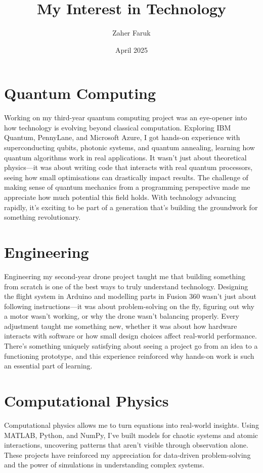 \documentclass{article}
\title{My Interest in Technology}
\author{Zaher Faruk}
\date{April 2025}
\begin{document}
\maketitle

\section{Quantum Computing}

Working on my third-year quantum computing project was an eye-opener into how technology is evolving beyond classical computation. Exploring IBM Quantum, PennyLane, and Microsoft Azure, I got hands-on experience with superconducting qubits, photonic systems, and quantum annealing, learning how quantum algorithms work in real applications. It wasn’t just about theoretical physics—it was about writing code that interacts with real quantum processors, seeing how small optimisations can drastically impact results. The challenge of making sense of quantum mechanics from a programming perspective made me appreciate how much potential this field holds. With technology advancing rapidly, it’s exciting to be part of a generation that’s building the groundwork for something revolutionary.

\section{Engineering}

Engineering my second-year drone project taught me that building something from scratch is one of the best ways to truly understand technology. Designing the flight system in Arduino and modelling parts in Fusion 360 wasn’t just about following instructions—it was about problem-solving on the fly, figuring out why a motor wasn’t working, or why the drone wasn’t balancing properly. Every adjustment taught me something new, whether it was about how hardware interacts with software or how small design choices affect real-world performance. There’s something uniquely satisfying about seeing a project go from an idea to a functioning prototype, and this experience reinforced why hands-on work is such an essential part of learning.

\section{Computational Physics}

Computational physics allows me to turn equations into real-world insights. Using MATLAB, Python, and NumPy, I’ve built models for chaotic systems and atomic interactions, uncovering patterns that aren’t visible through observation alone. These projects have reinforced my appreciation for data-driven problem-solving and the power of simulations in understanding complex systems.
\end{document}
